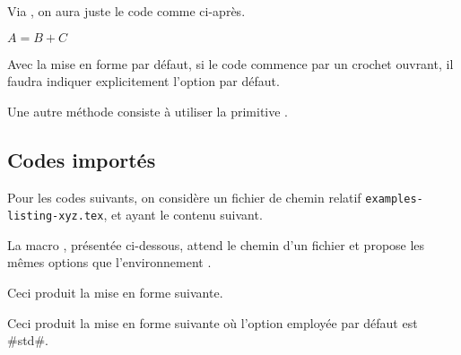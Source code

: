 \begin{tdocexa}
    Via , on aura juste le code comme ci-après.

    \begin{tdoclatex}[code]
        $A = B + C$
    \end{tdoclatex}
\end{tdocexa}




\begin{tdocwarn}
    Avec la mise en forme par défaut, si le code commence par un crochet ouvrant, il faudra indiquer explicitement l'option par défaut.
    
    \smallskip
    
    Une autre méthode consiste à utiliser la primitive .
\end{tdocwarn}


\subsection{Codes importés}

Pour les codes suivants, on considère un fichier de chemin relatif \verb+examples-listing-xyz.tex+, et ayant le contenu suivant.


\medskip

La macro , présentée ci-dessous, attend le chemin d'un fichier et propose les mêmes options que l'environnement .




\begin{tdocexa}
    \leavevmode

    \begin{tdoclatex}[code]
    \end{tdoclatex}

    Ceci produit la mise en forme suivante.

\end{tdocexa}




\begin{tdocexa}[À la suite]
    \leavevmode

    \begin{tdoclatex}[code]
    \end{tdoclatex}

    Ceci produit la mise en forme suivante où l'option employée par défaut est \tdocinlatex#std#.

\end{tdocexa}


